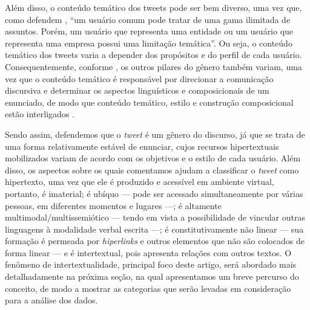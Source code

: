 \documentclass{textolivre}
\begin{document}
Além disso, o conteúdo temático dos tweets pode ser bem diverso, uma vez que, como defendem \textcite{freitas_genero_2015}, “um usuário comum pode tratar de uma gama ilimitada de assuntos. Porém, um usuário que representa uma entidade ou um usuário que representa uma empresa possui uma limitação temática”. Ou seja, o conteúdo temático dos tweets varia a depender dos propósitos e do perfil de cada usuário. Consequentemente, conforme \textcite{azevedo_o_2021}, os outros pilares do gênero também variam, uma vez que o conteúdo temático é responsável por direcionar a comunicação discursiva e determinar os aspectos linguísticos e composicionais de um enunciado, de modo que conteúdo temático, estilo e construção composicional estão interligados \cite{bakhtin_os_2011}.

Sendo assim, defendemos que o \textit{tweet} é um gênero do discurso, já que se trata de uma forma relativamente estável de enunciar, cujos recursos hipertextuais mobilizados variam de acordo com os objetivos e o estilo de cada usuário. Além disso, os aspectos sobre os quais comentamos ajudam a classificar o \textit{tweet} como hipertexto, uma vez que ele é produzido e acessível em ambiente virtual, portanto, é imaterial; é ubíquo — pode ser acessado simultaneamente por várias pessoas, em diferentes momentos e lugares —; é altamente multimodal/multissemiótico — tendo em vista a possibilidade de vincular outras linguagens à modalidade verbal escrita —; é constitutivamente não linear — sua formação é permeada por \textit{hiperlinks} e outros elementos que não são colocados de forma linear — e é intertextual, pois apresenta relações com outros textos. O fenômeno de intertextualidade, principal foco deste artigo, será abordado mais detalhadamente na próxima seção, na qual apresentamos um breve percurso do conceito, de modo a mostrar as categorias que serão levadas em consideração para a análise dos dados.
\end{document}
